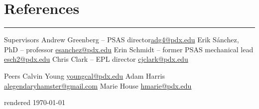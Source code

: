 \vfill
\section{References}
\noindent\rule{\textwidth}{\hlinewidth}
	\begin{innerlist}
	\item Supervisors
		\subitem Andrew Greenberg -- PSAS director\hfill\href{mailto:adg4@pdx.edu}{adg4@pdx.edu}
		\subitem Erik S\'anchez, PhD -- professor \hfill\href{mailto:esanchez@pdx.edu}{esanchez@pdx.edu}
		\subitem Erin Schmidt -- former PSAS mechanical lead \hfill\href{mailto:esch2@pdx.edu}{esch2@pdx.edu}
		\subitem Chris Clark -- EPL director \hfill\href{mailto:cjclark@pdx.edu}{cjclark@pdx.edu}
	\item Peers
		\subitem Calvin Young \hfill\href{mailto:youngcal@pdx.edu}{youngcal@pdx.edu}
		\subitem Adam Harris \hfill\href{mailto:alegendaryhamster@gmail.com}{alegendaryhamster@gmail.com}
		\subitem Marie House \hfill\href{mailto:hmarie@pdx.edu}{hmarie@pdx.edu}
	\end{innerlist}

\vfill
\centering rendered \today

